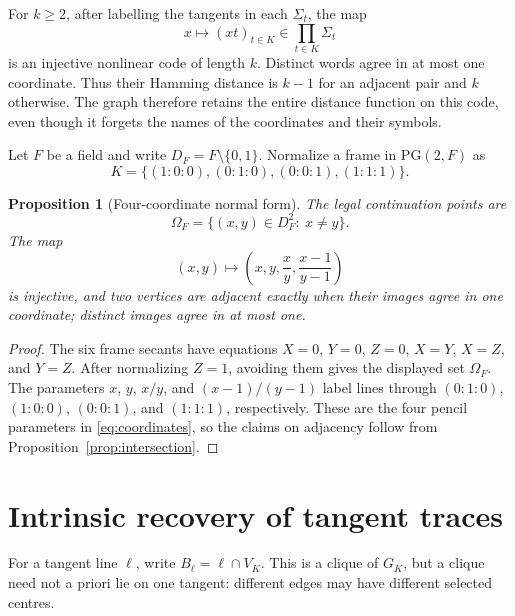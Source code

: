 \documentclass[11pt]{article}
\newtheorem{proposition}[theorem]{Proposition}
\theoremstyle{definition}
\theoremstyle{remark}
\newcommand{\PG}{\mathrm{PG}}
\begin{document}
For $k\ge2$, after labelling the tangents in each $\Sigma_t$, the map
\[
  x\longmapsto(xt)_{t\in K}\in\prod_{t\in K}\Sigma_t
\]
is an injective nonlinear code of length $k$.  Distinct words agree in at
most one coordinate. Thus their Hamming distance is $k-1$ for an
adjacent pair and $k$ otherwise. The graph therefore retains the entire
distance function on this code, even though it forgets the names of the
coordinates and their symbols.

Let $F$ be a field and write $D_F=F\setminus\{0,1\}$. Normalize a frame in
$\PG(2,F)$ as
\[
 K=\{(1:0:0),(0:1:0),(0:0:1),(1:1:1)\}.
\]

\begin{proposition}[Four-coordinate normal form]\label{prop:normal}
The legal continuation points are
\[
 \Omega_F=\{(x,y)\in D_F^2:\ x\ne y\}.
\]
The map
\begin{equation}
 (x,y)\longmapsto
 \left(x,y,\frac{x}{y},\frac{x-1}{y-1}\right)
 \label{eq:coordinates}
\end{equation}
is injective, and two vertices are adjacent exactly when their images agree
in one coordinate; distinct images agree in at most one.
\end{proposition}

\begin{proof}
The six frame secants have equations
$X=0$, $Y=0$, $Z=0$, $X=Y$, $X=Z$, and $Y=Z$.
After normalizing $Z=1$, avoiding them gives the displayed set $\Omega_F$.
The parameters $x$, $y$, $x/y$, and $(x-1)/(y-1)$ label lines through
$(0:1:0)$, $(1:0:0)$, $(0:0:1)$, and $(1:1:1)$, respectively. These
are the four pencil parameters in \eqref{eq:coordinates}, so the claims
on adjacency follow from Proposition~\ref{prop:intersection}.
\end{proof}


\section{Intrinsic recovery of tangent traces}
\label{sec:traces}

For a tangent line $\ell$, write $B_\ell=\ell\cap V_K$.  This is a clique
of $G_K$, but a clique need not a priori lie on one tangent: different
edges may have different selected centres.
\end{document}
